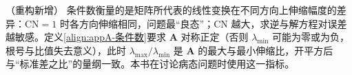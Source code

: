 \documentclass[../main.tex]{subfiles}
\begin{document}
\begin{remark}（重构新增）
条件数衡量的是矩阵所代表的线性变换在不同方向上伸缩幅度的差异：$\mathrm{CN}=1$ 时各方向伸缩相同，问题最“良态”；$\mathrm{CN}$ 越大，求逆与解方程对误差越敏感。定义\eqref{align:appA-条件数}要求 $\bm{A}$ 对称正定（否则 $\lambda_{\min}$ 可能为零或为负，根号与比值失去意义），此时 $\lambda_{\max}/\lambda_{\min}$ 是 $\bm{A}$ 的最大与最小伸缩比，开平方后与“标准差之比”的量纲一致。本书在讨论病态问题时使用这一指标。
\end{remark}
\end{document}
